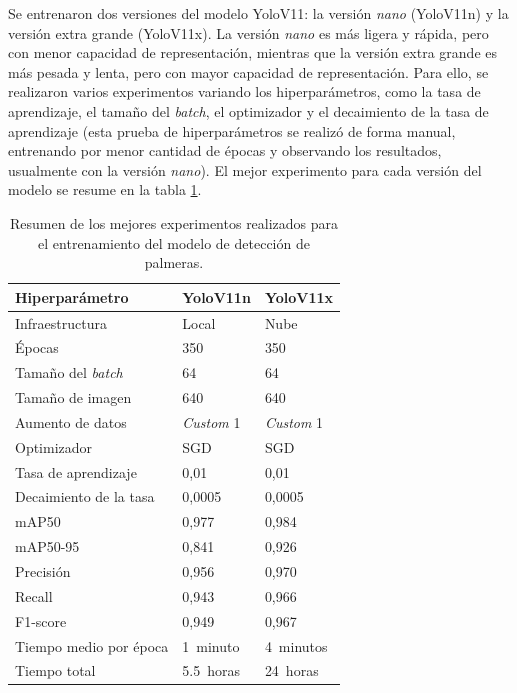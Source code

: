 Se entrenaron dos versiones del modelo YoloV11: la versión \textit{nano} (YoloV11n) y la versión extra grande (YoloV11x). La versión \textit{nano} es más ligera y rápida, pero con menor capacidad de representación, mientras que la versión extra grande es más pesada y lenta, pero con mayor capacidad de representación. Para ello, se realizaron varios experimentos variando los hiperparámetros, como la tasa de aprendizaje, el tamaño del \textit{batch}, el optimizador y el decaimiento de la tasa de aprendizaje (esta prueba de hiperparámetros se realizó de forma manual, entrenando por menor cantidad de épocas y observando los resultados, usualmente con la versión \textit{nano}). El mejor experimento para cada versión del modelo se resume en la tabla \ref{tab:experimentos-palmeras}.

\begin{table}[H]
    \centering
    \caption[Experimentos modelo detección de palmeras]{Resumen de los mejores experimentos realizados para el entrenamiento del modelo de detección de palmeras.}
    \begin{tabular}{ l l l }
        \toprule
        \textbf{Hiperparámetro}   & \textbf{YoloV11n} & \textbf{YoloV11x} \\
        \midrule
        Infraestructura           & Local             & Nube              \\
        Épocas                    & 350               & 350               \\
        Tamaño del \textit{batch} & 64                & 64                \\
        Tamaño de imagen          & 640               & 640               \\
        Aumento de datos          & \textit{Custom} 1 & \textit{Custom} 1 \\
        Optimizador               & SGD               & SGD               \\
        Tasa de aprendizaje       & 0,01              & 0,01              \\
        Decaimiento de la tasa    & 0,0005            & 0,0005            \\
        mAP50                     & 0,977             & 0,984             \\
        mAP50-95                  & 0,841             & 0,926             \\
        Precisión                 & 0,956             & 0,970             \\
        Recall                    & 0,943             & 0,966             \\
        F1-score                  & 0,949             & 0,967             \\
        Tiempo medio por época    & \SI{1}{minuto}    & \SI{4}{minutos}   \\
        Tiempo total              & \SI{5,5}{horas}   & \SI{24}{horas}    \\
        \bottomrule
        \hline
    \end{tabular}
    \label{tab:experimentos-palmeras}
\end{table}

